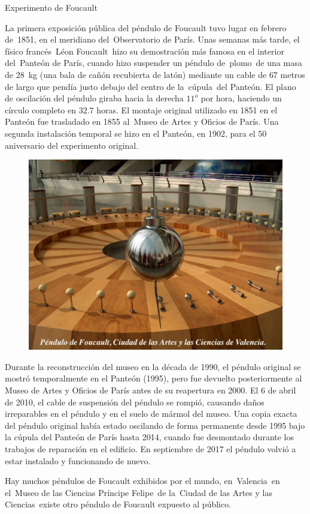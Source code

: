\begin{myblock}{Experimento de Foucault}

\vspace{2mm} La primera exposición pública del péndulo de Foucault tuvo lugar en febrero de 1851, en el meridiano del Observatorio de París. Unas semanas más tarde, el físico francés Léon Foucault hizo su demostración más famosa en el interior del Panteón de París, cuando hizo suspender un péndulo de plomo de una masa de $28$ kg (una bala de cañón recubierta de latón) mediante un cable de $67$ metros de largo que pendía justo debajo del centro de la cúpula del Panteón. El plano de oscilación del péndulo giraba hacia la derecha $11^o$ por hora, haciendo un círculo completo en $32.7$ horas. El montaje original utilizado en 1851 en el Panteón fue trasladado en 1855 al Museo de Artes y Oficios de París. Una segunda instalación temporal se hizo en el Panteón, en 1902, para el 50 aniversario del experimento original.

\begin{figure}[H]
	\centering
	\includegraphics[width=.75\textwidth]{imagenes/imagenes11/T11IM12.png}
\end{figure}

\vspace{2mm} Durante la reconstrucción del museo en la década de 1990, el péndulo original se mostró temporalmente en el Panteón (1995), pero fue devuelto posteriormente al Museo de Artes y Oficios de París antes de su reapertura en 2000. El 6 de abril de 2010, el cable de suspensión del péndulo se rompió, causando daños irreparables en el péndulo y en el suelo de mármol del museo. Una copia exacta del péndulo original había estado oscilando de forma permanente desde 1995 bajo la cúpula del Panteón de París hasta 2014, cuando fue desmontado durante los trabajos de reparación en el edificio. En septiembre de 2017 el péndulo volvió a estar instalado y funcionando de nuevo.

\vspace{2mm} Hay muchos péndulos de Foucault exhibidos por el mundo, en Valencia en el Museo de las Ciencias Príncipe Felipe de la Ciudad de las Artes y las Ciencias existe otro péndulo de Foucault expuesto al público.	
\end{myblock}







